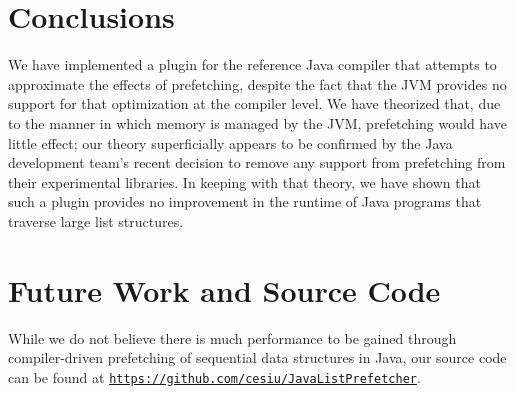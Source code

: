 \documentclass[journal]{IEEEtran}
\begin{document}
\section{Conclusions}

We have implemented a plugin for the reference Java compiler that attempts to approximate the effects of prefetching, despite the fact that the JVM provides no support for that optimization at the compiler level. We have theorized that, due to the manner in which memory is managed by the JVM, prefetching would have little effect; our theory superficially appears to be confirmed by the Java development team's recent decision to remove any support from prefetching from their experimental libraries. In keeping with that theory, we have shown that such a plugin provides no improvement in the runtime of Java programs that traverse large list structures.


\section{Future Work and Source Code}

While we do not believe there is much performance to be gained through compiler-driven prefetching of sequential data structures in Java, our source code can be found at \texttt{\url{https://github.com/cesiu/JavaListPrefetcher}}.




\end{document}
